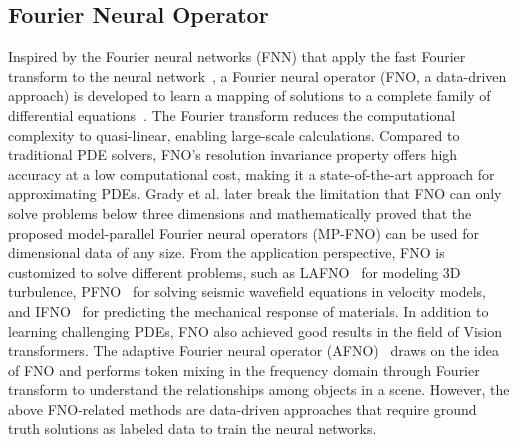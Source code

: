 \subsection{Fourier Neural Operator}
Inspired by the Fourier neural networks (FNN) that apply the fast Fourier transform to the neural network~\cite{silvescu1999fourier}, a Fourier neural operator (FNO, a data-driven approach) is developed to learn a mapping of solutions to a complete family of differential equations~\cite{li2020fourier}. 
The Fourier transform reduces the computational complexity to quasi-linear, enabling large-scale calculations. 
Compared to traditional PDE solvers, FNO's resolution invariance property offers high accuracy at a low computational cost, making it a state-of-the-art approach for approximating PDEs.
Grady et al.\cite{grady2022towards} later break the limitation that FNO can only solve problems below three dimensions and mathematically proved that the proposed model-parallel Fourier neural operators (MP-FNO) can be used for dimensional data of any size. 
From the application perspective, FNO is customized to solve different problems, such as LAFNO~\cite{peng2022linear} for modeling 3D turbulence, PFNO~\cite{li2022solving} for solving seismic wavefield equations in velocity models, and IFNO~\cite{you2022learning} for predicting the mechanical response of materials.
In addition to learning challenging PDEs, FNO also achieved good results in the field of Vision transformers. The adaptive Fourier neural operator (AFNO)~\cite{guibas2021adaptive} draws on the idea of FNO and performs token mixing in the frequency domain through Fourier transform to understand the relationships among objects in a scene.
However, the above FNO-related methods are data-driven approaches that require ground truth solutions as labeled data to train the neural networks.